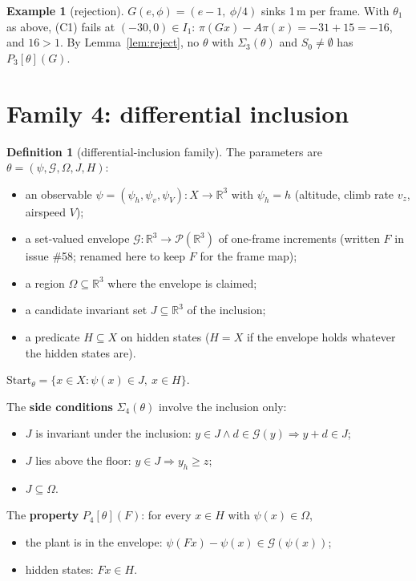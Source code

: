\documentclass[11pt]{article}
\theoremstyle{definition}
\newtheorem{definition}[theorem]{Definition}
\newtheorem{example}[theorem]{Example}
\newcommand{\R}{\mathbb{R}}
\newcommand{\Start}{\ensuremath{\mathrm{Start}}}
\newcommand{\G}{\mathcal{G}}
\begin{document}
\begin{example}[rejection]\label{ex:sfnot}
$G(e, \phi) = (e - 1,\ \phi/4)$ sinks 1\,m per frame. With $\theta_1$ as above, (C1) fails at $(-30, 0) \in I_1$: $\pi(G x) - A\pi(x) = -31 + 15 = -16$, and $16 > 1$. By Lemma~\ref{lem:reject}, no $\theta$ with $\Sigma_3(\theta)$ and $S_0 \ne \emptyset$ has $P_3[\theta](G)$.
\end{example}

\section{Family 4: differential inclusion}\label{sec:incl}

\begin{definition}[differential-inclusion family]\label{def:incl}
The parameters are $\theta = (\psi, \G, \Omega, J, H)$:
\begin{itemize}
\item an observable $\psi = (\psi_h, \psi_v, \psi_V) : X \to \R^3$ with $\psi_h = h$ (altitude, climb rate $v_z$, airspeed $V$);
\item a set-valued envelope $\G : \R^3 \to \mathcal{P}(\R^3)$ of one-frame increments (written $F$ in issue \#58; renamed here to keep $F$ for the frame map);
\item a region $\Omega \subseteq \R^3$ where the envelope is claimed;
\item a candidate invariant set $J \subseteq \R^3$ of the inclusion;
\item a predicate $H \subseteq X$ on hidden states ($H = X$ if the envelope holds whatever the hidden states are).
\end{itemize}
$\Start_\theta = \{x \in X : \psi(x) \in J,\ x \in H\}$.

The \textbf{side conditions} $\Sigma_4(\theta)$ involve the inclusion only:
\begin{itemize}
\item[(D1)] $J$ is invariant under the inclusion: $y \in J \wedge d \in \G(y) \Rightarrow y + d \in J$;
\item[(D2)] $J$ lies above the floor: $y \in J \Rightarrow y_h \ge z$;
\item[(D3)] $J \subseteq \Omega$.
\end{itemize}
The \textbf{property} $P_4[\theta](F)$: for every $x \in H$ with $\psi(x) \in \Omega$,
\begin{itemize}
\item[(E1)] the plant is in the envelope: $\psi(F x) - \psi(x) \in \G(\psi(x))$;
\item[(E2)] hidden states: $F x \in H$.
\end{itemize}
\end{definition}
\end{document}
